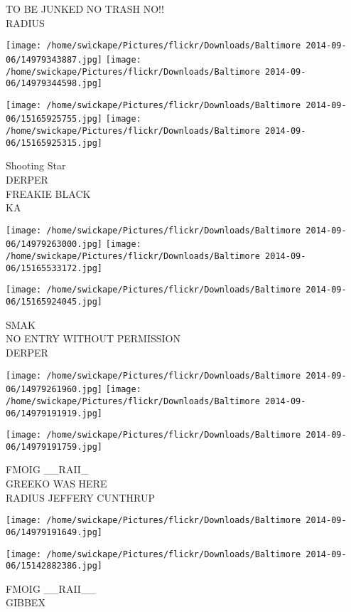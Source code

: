 \documentclass[10pt,letterpaper]{article}
\begin{document}
TO BE JUNKED NO TRASH NO!!\\
RADIUS
\pagebreak

\texttt{[image: /home/swickape/Pictures/flickr/Downloads/Baltimore 2014-09-06/14979343887.jpg]}
\texttt{[image: /home/swickape/Pictures/flickr/Downloads/Baltimore 2014-09-06/14979344598.jpg]}

\texttt{[image: /home/swickape/Pictures/flickr/Downloads/Baltimore 2014-09-06/15165925755.jpg]}
\texttt{[image: /home/swickape/Pictures/flickr/Downloads/Baltimore 2014-09-06/15165925315.jpg]}

Shooting Star\\
DERPER\\
FREAKIE BLACK\\
KA
\pagebreak

\texttt{[image: /home/swickape/Pictures/flickr/Downloads/Baltimore 2014-09-06/14979263000.jpg]}
\texttt{[image: /home/swickape/Pictures/flickr/Downloads/Baltimore 2014-09-06/15165533172.jpg]}

\vspace{0.25in}
\texttt{[image: /home/swickape/Pictures/flickr/Downloads/Baltimore 2014-09-06/15165924045.jpg]}

SMAK\\
NO ENTRY WITHOUT PERMISSION\\
DERPER
\pagebreak

\texttt{[image: /home/swickape/Pictures/flickr/Downloads/Baltimore 2014-09-06/14979261960.jpg]}
\texttt{[image: /home/swickape/Pictures/flickr/Downloads/Baltimore 2014-09-06/14979191919.jpg]}

\vspace{0.25in}
\texttt{[image: /home/swickape/Pictures/flickr/Downloads/Baltimore 2014-09-06/14979191759.jpg]}

FMOIG \_\_RAII\_\\
GREEKO WAS HERE\\
RADIUS JEFFERY CUNTHRUP
\pagebreak

\texttt{[image: /home/swickape/Pictures/flickr/Downloads/Baltimore 2014-09-06/14979191649.jpg]}

\vspace{0.25in}
\texttt{[image: /home/swickape/Pictures/flickr/Downloads/Baltimore 2014-09-06/15142882386.jpg]}

FMOIG \_\_RAII\_\_\\
GIBBEX
\pagebreak
\end{document}
